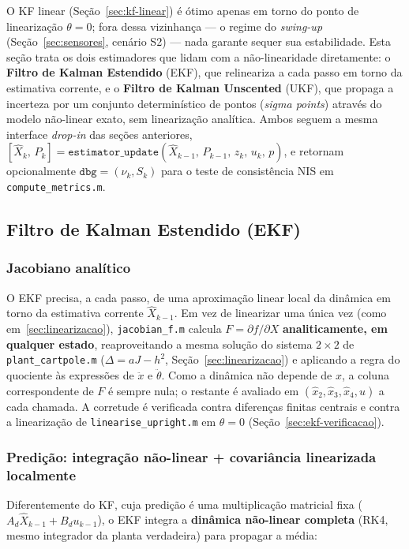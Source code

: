 \documentclass[brazil, 12pt]{article}
\begin{document}
O KF linear (Seção~\ref{sec:kf-linear}) é ótimo apenas em torno do ponto de
linearização $\theta=0$; fora dessa vizinhança — o regime do
\emph{swing-up} (Seção~\ref{sec:sensores}, cenário S2) — nada garante sequer
sua estabilidade. Esta seção trata os dois estimadores que lidam com a
não-linearidade diretamente: o \textbf{Filtro de Kalman Estendido} (EKF), que
relineariza a cada passo em torno da estimativa corrente, e o \textbf{Filtro
de Kalman Unscented} (UKF), que propaga a incerteza por um conjunto
determinístico de pontos (\emph{sigma points}) através do modelo não-linear
exato, sem linearização analítica. Ambos seguem a mesma interface
\emph{drop-in} das seções anteriores,
$[\hat X_k,\,P_k] = \texttt{estimator\_update}(\hat X_{k-1},\,P_{k-1},\,z_k,\,u_k,\,p)$,
e retornam opcionalmente $\texttt{dbg} = (\nu_k, S_k)$ para o teste de
consistência NIS em \texttt{compute\_metrics.m}.

\subsection{Filtro de Kalman Estendido (EKF)}
\label{sec:ekf}

\subsubsection{Jacobiano analítico}

O EKF precisa, a cada passo, de uma aproximação linear local da dinâmica em
torno da estimativa corrente $\hat X_{k-1}$. Em vez de linearizar uma única
vez (como em~\ref{sec:linearizacao}), \texttt{jacobian\_f.m} calcula
$F=\partial f/\partial X$ \textbf{analiticamente, em qualquer estado},
reaproveitando a mesma solução do sistema $2\times2$ de
\texttt{plant\_cartpole.m} ($\Delta=aJ-h^2$, Seção~\ref{sec:linearizacao}) e
aplicando a regra do quociente às expressões de $\ddot x$ e $\ddot\theta$.
Como a dinâmica não depende de $x$, a coluna correspondente de $F$ é sempre
nula; o restante é avaliado em $(\hat x_2,\hat x_3,\hat x_4,u)$ a cada
chamada. A corretude é verificada contra diferenças finitas centrais e contra
a linearização de \texttt{linearise\_upright.m} em $\theta=0$
(Seção~\ref{sec:ekf-verificacao}).

\subsubsection{Predição: integração não-linear + covariância linearizada localmente}

Diferentemente do KF, cuja predição é uma multiplicação matricial fixa
($A_d\hat X_{k-1}+B_d u_{k-1}$), o EKF integra a \textbf{dinâmica não-linear
completa} (RK4, mesmo integrador da planta verdadeira) para propagar a média:
\end{document}
